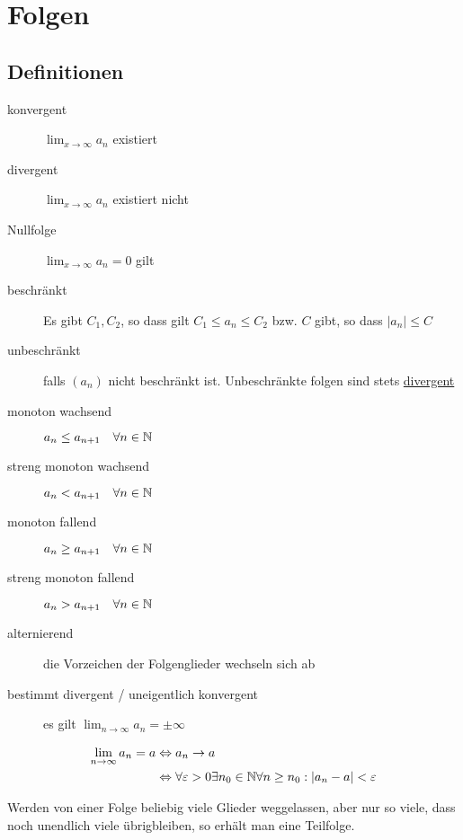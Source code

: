 \section{Folgen}

\subsection{Definitionen}
\begin{description}
  \item[konvergent] $\lim_{x \to \infty} a_n$ existiert
  \item[divergent] $\lim_{x \to \infty} a_n$ existiert nicht
  \item[Nullfolge] $\lim_{x \to \infty} a_n = 0$ gilt
  \item[beschränkt] Es gibt $C_1, C_2$, so dass gilt $C_1 \leq a_n \leq C_2$
  bzw. $C$ gibt, so dass $|a_n| \leq C$
  \item[unbeschränkt] falls $(a_n)$ nicht beschränkt ist. Unbeschränkte folgen
  sind stets \underline{divergent}
  \item[monoton wachsend] $a_n \leq a_{n+1} \quad \forall n \in \mathbb{N}$
  \item[streng monoton wachsend] $a_n < a_{n+1} \quad \forall n \in \mathbb{N}$
  \item[monoton fallend] $a_n \geq a_{n+1} \quad \forall n \in \mathbb{N}$
  \item[streng monoton fallend] $a_n > a_{n+1} \quad \forall n \in \mathbb{N}$
  \item[alternierend] die Vorzeichen der Folgenglieder wechseln sich ab
  \item[bestimmt divergent / uneigentlich konvergent] es gilt $\lim_{n \to
  \infty} a_n = \pm \infty$
\end{description}

\begin{definition}[Grenzwert]
	\begin{align*}
		\lim_{n \to \infty} a_n = a & \Leftrightarrow a_n \to a \\
		& \Leftrightarrow \forall \varepsilon > 0 \exists n_0 \in \mathbb{N} \forall n \geq n_0:
		|a_n - a| < \varepsilon
	\end{align*}
\end{definition}

\begin{definition}[Teilfolge]
Werden von einer Folge beliebig viele Glieder weggelassen, aber nur so viele,
dass noch unendlich viele übrigbleiben, so erhält man eine Teilfolge.
\end{definition}

